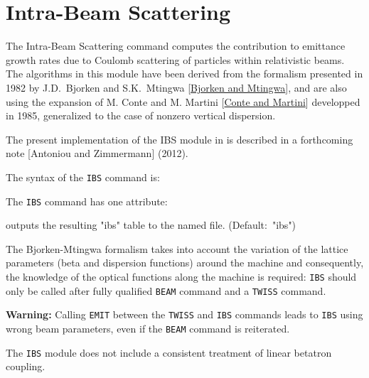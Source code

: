 

\chapter{Intra-Beam Scattering}
\label{chap:IBS}

The Intra-Beam Scattering command computes the contribution to emittance
growth rates due to Coulomb scattering of particles within relativistic
beams. The algorithms in this module have been derived from the formalism
presented in 1982 by J.D.~Bjorken and S.K.~Mtingwa
[\href{../Introduction/bibliography.html#bm1}{Bjorken and Mtingwa}], 
and are also using the expansion of M. Conte and M. Martini
[\href{../Introduction/bibliography.html#conte}{Conte and Martini}]
developped in 1985,  generalized to the case of nonzero vertical
dispersion.  

The present implementation of the IBS module in \madx is described in a
forthcoming note  [Antoniou and Zimmermann] (2012).   

The syntax of the \texttt{IBS} command is:

The \texttt{IBS} command has one attribute:
\begin{madlist}
   outputs the resulting "ibs" table to
  the named file. (Default:~"ibs")
\end{madlist}

The Bjorken-Mtingwa formalism takes into account the variation of the
lattice parameters (beta and dispersion functions) around the
machine and consequently, the knowledge of the optical functions along
the machine is required: \texttt{IBS} should only be called after fully
qualified \texttt{BEAM} command and a \texttt{TWISS} command. 

{\bf Warning:} Calling \texttt{EMIT} between the \texttt{TWISS} and
\texttt{IBS} commands leads to \texttt{IBS} using wrong beam parameters,
even if the \texttt{BEAM} command is reiterated.

The \texttt{IBS} module does not include a consistent treatment of
linear betatron coupling.   

